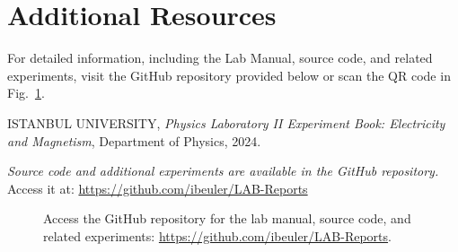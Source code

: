 \documentclass[journal]{IEEEtran}
\begin{document}
\section{Additional Resources}
For detailed information, including the Lab Manual, source code, and related experiments, visit the GitHub repository provided below or scan the QR code in Fig.~\ref{fig:qr}.

\begin{thebibliography}{9}

    ISTANBUL UNIVERSITY, 
    \textit{Physics Laboratory II Experiment Book: Electricity and Magnetism}, 
    Department of Physics, 2024.

    \textit{Source code and additional experiments are available in the GitHub repository.} \\ 
    Access it at: \url{https://github.com/ibeuler/LAB-Reports}

\end{thebibliography}

\begin{figure}[H]
    
    \centering
    \begin{minipage}{0.15\textwidth}
        \centering
    \end{minipage}%
    \begin{minipage}{0.2\textwidth}
        \raggedright
        \caption{Access the GitHub repository for the lab manual, source code, and related experiments: \href{https://github.com/ibeuler/LAB-Reports}{\url{https://github.com/ibeuler/LAB-Reports}}.}
    \end{minipage}
    \label{fig:qr}
\end{figure}
\end{document}
